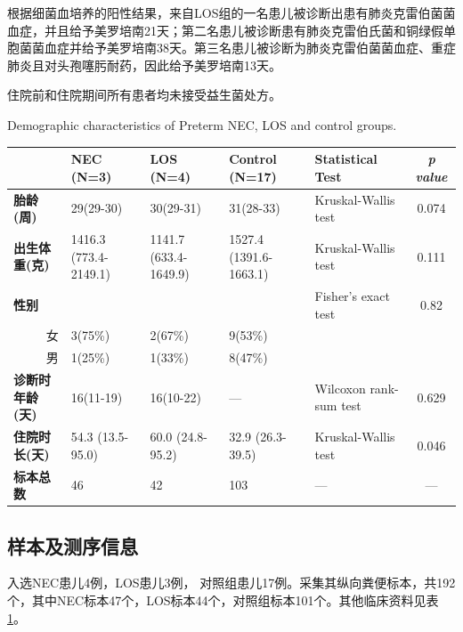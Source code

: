   根据细菌血培养的阳性结果，来自LOS组的一名患儿被诊断出患有肺炎克雷伯菌菌血症，并且给予美罗培南21天；第二名患儿被诊断患有肺炎克雷伯氏菌和铜绿假单胞菌菌血症并给予美罗培南38天。第三名患儿被诊断为肺炎克雷伯菌菌血症、重症肺炎且对头孢噻肟耐药，因此给予美罗培南13天。

  住院前和住院期间所有患者均未接受益生菌处方。

  \begin{table}[!hpb]
    \centering
      {Demographic characteristics of Preterm NEC, LOS and control groups.}
    \label{tab:necdemographic}
    \begin{tabular}{lp{1.8cm}p{1.8cm}p{1.8cm}p{2cm}c}
      \toprule
         & \textbf{NEC (N=3)} & \textbf{LOS (N=4)} & \textbf{Control (N=17)} & \textbf{Statistical Test} & \textit{p value} \\ \midrule
        \textbf{胎龄(周)} & 29(29-30) & 30(29-31) & 31(28-33) & Kruskal-Wallis test & 0.074 \\
        \textbf{出生体重(克)} & 1416.3 (773.4-2149.1) & 1141.7 (633.4-1649.9) & 1527.4 (1391.6-1663.1) & Kruskal-Wallis test & 0.111 \\
        \textbf{性别} &  &  &  & Fisher's exact test & 0.82 \\
        \multicolumn{1}{r}{女} & 3(75\%) & 2(67\%) & 9(53\%) &  & \\
        \multicolumn{1}{r}{男} & 1(25\%) & 1(33\%) & 8(47\%) &  & \\
        \textbf{诊断时年龄(天)} & 16(11-19) & 16(10-22) & — & Wilcoxon rank-sum test & 0.629 \\
        \textbf{住院时长(天)} & 54.3 (13.5-95.0) & 60.0 (24.8-95.2) & 32.9 (26.3-39.5) & Kruskal-Wallis test & 0.046 \\
        \textbf{标本总数} & 46 & 42 & 103 & — & — \\ \bottomrule
    \end{tabular}
  \end{table}

  \subsection{样本及测序信息}
  入选NEC患儿4例，LOS患儿3例， 对照组患儿17例。采集其纵向粪便标本，共192个，其中NEC标本47个，LOS标本44个，对照组标本101个。其他临床资料见表\ref{tab:necdemographic}。

